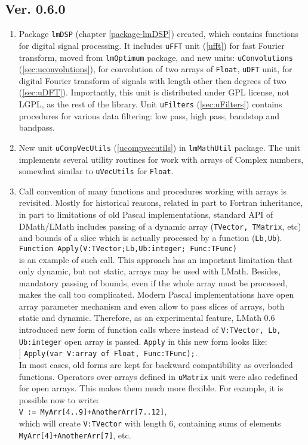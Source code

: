 \documentclass[12pt,a4paper,oneside]{report}
\newcommand{\code}[1]{\texttt{#1}}
\begin{document}
\subsection*{Ver. 0.6.0}
\begin{enumerate}
	\item{Package \code{lmDSP} (chapter \ref{package-lmDSP}) created, which contains functions for digital signal processing. It includes \code{uFFT} unit (\ref{ufft}) for fast Fourier transform, moved from \code{lmOptimum} package, and new units: \code{uConvolutions} (\ref{sec:uconvolutions}), for convolution of two arrays of \code{Float}, \code{uDFT}  unit, for digital Fourier transform of signals with length other then degrees of two (\ref{sec:uDFT}). Importantly, this unit is distributed under GPL license, not LGPL, as the rest of the library. Unit \code{uFilters} (\ref{sec:uFilters}) contains procedures for various data filtering: low pass, high pass, bandstop and bandpass.}
	\item{New unit \code{uCompVecUtils} (\ref{ucompvecutils}) in \code{lmMathUtil} package. The unit implements several utility routines for work with arrays of Complex numbers, somewhat similar to \code{uVecUtils} for \code{Float}.}
	\item{Call convention of many functions and procedures working with arrays is revisited. Mostly for historical reasons, related in part to Fortran inheritance, in part to limitations of old Pascal implementations, standard API of DMath/LMath includes passing of a dynamic array (\code{TVector, TMatrix}, etc) and bounds of a slice which is actually processed by a function (\code{Lb,Ub}).\\[4pt] \code{Function Apply(V:TVector;Lb,Ub:integer; Func:TFunc)}\\[4pt] is an example of such call. This approach has an important limitation that only dynamic, but not static, arrays may be used with LMath. Besides, mandatory passing of bounds, even if the whole array must be processed, makes the call too complicated. Modern Pascal implementations have open array parameter mechanism and even allow to pass slices of arrays, both static and dynamic. Therefore, as an experimental feature, LMath 0.6 introduced new form of function calls where instead of \code{V:TVector, Lb, Ub:integer} open array is passed. \code{Apply} in this new form looks like:\\[4pt]] \code{Apply(var V:array of Float, Func:TFunc);}.\\[4pt] In most cases, old forms are kept for backward compatibility as overloaded functions. Operators over arrays defined in \code{uMatrix} unit were also redefined for open arrays. This makes them much more flexible. For example, it is possible now to write:\\[4pt]
		\code{V := MyArr[4..9]+AnotherArr[7..12]},\\[4pt] which will create \code{V:TVector} with length 6, containing sums of elements \code{MyArr[4]+AnotherArr[7]}, etc.
		
}
\end{enumerate}
\end{document}
